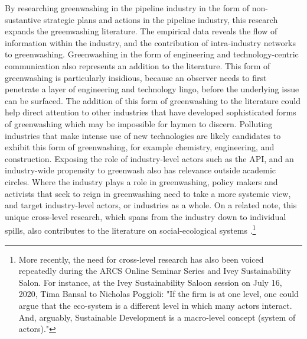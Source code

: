 By researching greenwashing in the pipeline industry in the form of non-sustantive strategic plans and actions in the pipeline industry, this research expands the greenwashing literature. The empirical data reveals the flow of information within the industry, and the contribution of intra-industry networks to greenwashing. Greenwashing in the form of engineering and technology-centric communication also represents an addition to the literature. This form of greenwashing is particularly insidious, because an observer needs to first penetrate a layer of engineering and technology lingo, before the underlying issue can be surfaced. The addition of this form of greenwashing to the literature could help direct attention to other industries that have developed sophisticated forms of greenwashing which may be impossible for laymen to discern. Polluting industries that make intense use of new technologies are likely candidates to exhibit this form of greenwashing, for example chemistry, engineering, and construction. Exposing the role of industry-level actors such as the API, and an industry-wide propensity to greenwash also has relevance outside academic circles. Where the industry plays a role in greenwashing, policy makers and activists that seek to reign in greenwashing need to take a more systemic view, and target industry-level actors, or industries as a whole. On a related note, this unique cross-level research, which spans from the industry down to individual spills, also contributes to the literature on social-ecological systems \citep{Reyers2018}.\footnote{More recently, the need for cross-level research has also been voiced repeatedly during the ARCS Online Seminar Series and Ivey Sustainability Salon. For instance, at the Ivey Sustainability Saloon session on July 16, 2020, Tima Bansal to Nicholas Poggioli: "If the firm is at one level, one could argue that the eco-system is a different level in which many actors interact. And, arguably, Sustainable Development is a macro-level concept (system of actors)."}

